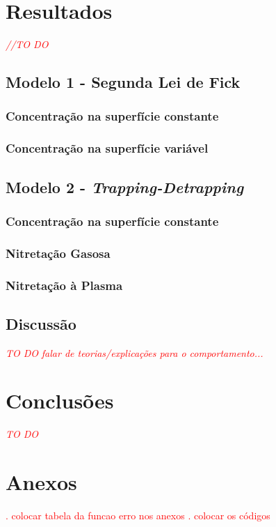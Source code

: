 \documentclass[]{politex}
\newcommand\myworries[1]{\textcolor{red}{#1}}
\begin{document}
\chapter{Resultados}
\myworries{\textit{//TO DO}}
\section{Modelo 1 - Segunda Lei de Fick}

\subsection{Concentração na superfície constante}
\label{sec:modelo11}


\subsection{Concentração na superfície variável}
\label{sec:modelo12}


\section{Modelo 2 - \textit{Trapping-Detrapping}}
\subsection{Concentração na superfície constante}
\label{sec:modelo21}


\subsection{Nitretação Gasosa}
\label{sec:modelo22}


\subsection{Nitretação à Plasma}
\label{sec:modelo23}


\section{Discussão}
\myworries{\textit{TO DO}}
\myworries{\textit{falar de teorias/explicações para o comportamento...}}


\chapter{Conclusões}
\myworries{\textit{TO DO}}






\chapter*{Anexos}
\myworries{. colocar tabela da funcao erro nos anexos}
\myworries{. colocar os códigos}
\end{document}
